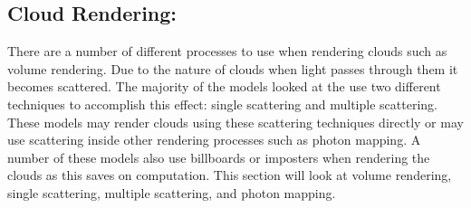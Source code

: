 \subsection{Cloud Rendering:}
\label{sec:cr}
There are a number of different processes to use when rendering clouds such as volume rendering.
Due to the nature of clouds when light passes through them it becomes scattered.
The majority of the models looked at the use two different techniques to accomplish this effect: single scattering and multiple scattering.
These models may render clouds using these scattering techniques directly or may use scattering inside other rendering processes such as photon mapping.
A number of these models also use billboards or imposters when rendering the clouds as this saves on computation.
This section will look at volume rendering, single scattering, multiple scattering, and photon mapping.





